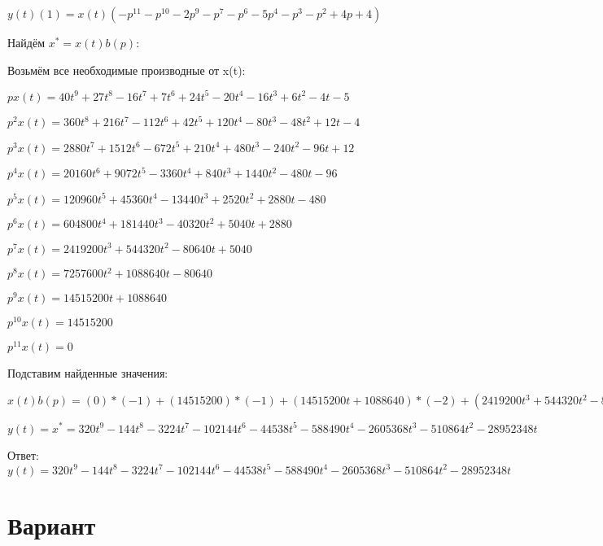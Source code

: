 \documentclass{article}
\begin{document}
{{{{{$y(t)(1)=x(t)(-p^{11}-p^{10}-2p^{9}-p^{7}-p^{6}-5p^{4}-p^{3}-p^{2}+4p+4)$

Найдём $x^*=x(t)b(p)$:

Возьмём все необходимые производные от x(t):

$px(t)=40t^{9}+27t^{8}-16t^{7}+7t^{6}+24t^{5}-20t^{4}-16t^{3}+6t^{2}-4t-5$

$p^2x(t)=360t^{8}+216t^{7}-112t^{6}+42t^{5}+120t^{4}-80t^{3}-48t^{2}+12t-4$

$p^3x(t)=2880t^{7}+1512t^{6}-672t^{5}+210t^{4}+480t^{3}-240t^{2}-96t+12$

$p^4x(t)=20160t^{6}+9072t^{5}-3360t^{4}+840t^{3}+1440t^{2}-480t-96$

$p^5x(t)=120960t^{5}+45360t^{4}-13440t^{3}+2520t^{2}+2880t-480$

$p^6x(t)=604800t^{4}+181440t^{3}-40320t^{2}+5040t+2880$

$p^7x(t)=2419200t^{3}+544320t^{2}-80640t+5040$

$p^8x(t)=7257600t^{2}+1088640t-80640$

$p^9x(t)=14515200t+1088640$

$p^10x(t)=14515200$

$p^11x(t)=0$

Подставим найденные значения:

$x(t)b(p) = (0)*(-1)+(14515200)*(-1)+(14515200t+1088640)*(-2)+(2419200t^{3}+544320t^{2}-80640t+5040)*(-1)+(604800t^{4}+181440t^{3}-40320t^{2}+5040t+2880)*(-1)+(20160t^{6}+9072t^{5}-3360t^{4}+840t^{3}+1440t^{2}-480t-96)*(-5)+(2880t^{7}+1512t^{6}-672t^{5}+210t^{4}+480t^{3}-240t^{2}-96t+12)*(-1)+(360t^{8}+216t^{7}-112t^{6}+42t^{5}+120t^{4}-80t^{3}-48t^{2}+12t-4)*(-1)+(40t^{9}+27t^{8}-16t^{7}+7t^{6}+24t^{5}-20t^{4}-16t^{3}+6t^{2}-4t-5)*4+(40t^{9}+27t^{8}-16t^{7}+7t^{6}+24t^{5}-20t^{4}-16t^{3}+6t^{2}-4t-5)*4=320t^{9}-144t^{8}-3224t^{7}-102144t^{6}-44538t^{5}-588490t^{4}-2605368t^{3}-510864t^{2}-28952348t$





$y(t)=x^*=320t^{9}-144t^{8}-3224t^{7}-102144t^{6}-44538t^{5}-588490t^{4}-2605368t^{3}-510864t^{2}-28952348t$

Ответ: $y(t) = 320t^{9}-144t^{8}-3224t^{7}-102144t^{6}-44538t^{5}-588490t^{4}-2605368t^{3}-510864t^{2}-28952348t$

\section{Вариант}

}}}}}
\end{document}
